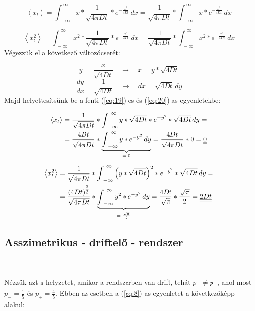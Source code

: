 \begin{equation} \label{eq:19}
    \left< x_{t} \right>
    =
    \int_{\ -\infty}^{\ \infty} x * \frac{1}{\sqrt{4 \pi D t}} * e^{-\tfrac{x^{2}}{4Dt}}\ dx
    =
    \frac{1}{\sqrt{4 \pi D t}} * \int_{\ -\infty}^{\ \infty} x * e^{-\tfrac{x^{2}}{4Dt}}\ dx
\end{equation}

\begin{equation} \label{eq:20}
    \left< x_{t}^{2} \right>
    =
    \int_{\ -\infty}^{\ \infty} x^{2} * \frac{1}{\sqrt{4 \pi D t}} * e^{-\tfrac{x^{2}}{4Dt}}\ dx
    =
    \frac{1}{\sqrt{4 \pi D t}} * \int_{\ -\infty}^{\ \infty} x^{2} * e^{-\tfrac{x^{2}}{4Dt}}\ dx
\end{equation}
Végezzük el a következő változócserét:

\begin{equation*}
    y := \frac{x}{\sqrt{4Dt}} \quad \to \quad x = y * \sqrt{4Dt}
\end{equation*}
\begin{equation*}
    \frac{dy}{dx} = \frac{1}{\sqrt{4Dt}} \quad \to \quad dx = \sqrt{4Dt}\, dy
\end{equation*}
Majd helyettesítsünk be a fenti (\ref{eq:19})-es és (\ref{eq:20})-as egyenletekbe:

\begin{align} \label{eq:21}
    \left< x_{t} \right>
    &=
    \frac{1}{\sqrt{4 \pi D t}} * \int_{\ -\infty}^{\ \infty} y * \sqrt{4Dt} * e^{-y^{2}} * \sqrt{4Dt}\, dy = \nonumber \\
    &=
    \frac{4Dt}{\sqrt{4 \pi D t}} * \underbrace{\int_{\ -\infty}^{\ \infty} y * e^{-y^{2}}\, dy}_{\text{\normalfont $= 0$}}
    =
    \frac{4Dt}{\sqrt{4 \pi D t}} * 0 = \doubleunderline{0}
\end{align}

\begin{align} \label{eq:22}
    \left< x_{t}^{2} \right>
    &=
    \frac{1}{\sqrt{4 \pi D t}} * \int_{\ -\infty}^{\ \infty} \left( y * \sqrt{4Dt} \right)^{2} * e^{-y^{2}} * \sqrt{4Dt}\, dy = \nonumber \\
    &=
    \frac{\left( 4Dt \right)^{\tfrac{3}{2}}}{\sqrt{4 \pi D t}} * \underbrace{\int_{\ -\infty}^{\ \infty} y^{2} * e^{-y^{2}}\, dy}_{\text{\normalfont $= \frac{\sqrt{\pi}}{2}$}}
    =
    \frac{4Dt}{\sqrt{\pi}} * \frac{\sqrt{\pi}}{2}
    =
    \underline{\underline{2Dt}}
\end{align}

\subsection{Asszimetrikus - driftelő - rendszer} \label{subsec:3.2}
\\ \\
Nézzük azt a helyzetet, amikor a rendszerben van drift, tehát $p_{-} \neq p_{+}$, ahol most $p_{-} = \frac{1}{5}$ és $p_{+} = \frac{4}{5}$. Ebben az esetben a (\ref{eq:8})-as egyenletet a következőképp alakul:

